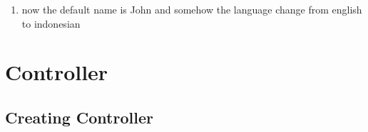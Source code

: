 \documentclass[12pt,titlepage]{article}
\begin{document}
\begin{enumerate}[label=\alph*.]
\begin{verbatim}
        use Illuminate\Support\Facades\Route;
        
        /*
        |--------------------------------------------------------------------------
        | Web Routes
        |--------------------------------------------------------------------------
        |
        | Here is where you can register web routes for your application. These
        | routes are loaded by the RouteServiceProvider and all of them will
        | be assigned to the "web" middleware group. Make something great!
        |
        */
        
        Route::get('/', function () {
            // return view('welcome');
            return 'Welcome';
        });
        
        Route::get('/hello', function () {
            return 'Hello World';
        });
        
        Route::get('/world', function () {
            return 'World';
        }); 
        
        Route::get('/about', function () {
            return '2241720145 - Muhammad Baihaqi Aulia Asyari';
        }); 
        
        Route::get('/user/{name?}', function ($name='John') {
            return 'Nama saya ' . $name;
        }); 
        
        Route::get('/posts/{post}/comments/{comment}', function ($postId, $commentId) {
            return 'Pos ke-' . $postId . ' komentar ke-: ' . $commentId;
        });
        
        Route::get('/articles/{id}', function ($id) {
            return 'Article Page with ID ' . $id;
        });        
    \end{verbatim}
    \item now the default name is John and somehow the language change from english to indonesian
\end{enumerate}

\section{Controller}
\subsection{Creating Controller}
\end{document}
